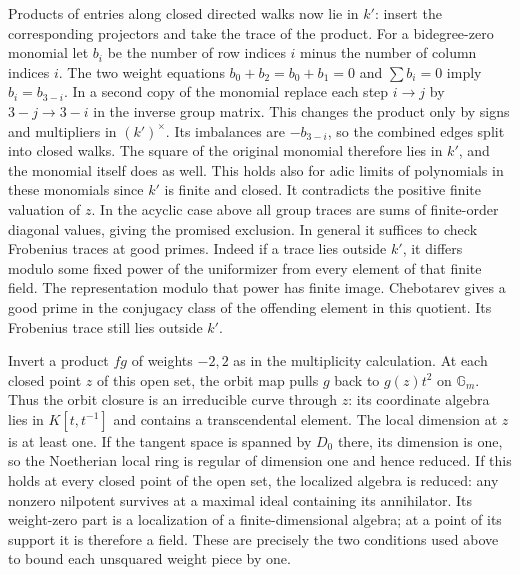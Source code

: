 \documentclass[11pt]{amsart}
\theoremstyle{definition}
\theoremstyle{remark}
\begin{document}
Products of entries along closed directed walks now lie in $k'$:
insert the corresponding projectors and take the trace of the product.
For a bidegree-zero monomial let $b_i$ be the number of row indices
$i$ minus the number of column indices $i$. The two weight equations
$b_0+b_2=b_0+b_1=0$ and $\sum b_i=0$ imply $b_i=b_{3-i}$.
In a second copy of the monomial replace each step $i\to j$ by
$3-j\to3-i$ in the inverse group matrix. This changes the product
only by signs and multipliers in $(k')^\times$. Its imbalances are
$-b_{3-i}$, so the combined edges split into closed walks. The
square of the original monomial therefore lies in $k'$, and the
monomial itself does as well. This holds also for adic limits of
polynomials in these monomials since $k'$ is finite and closed.
It contradicts the positive finite valuation of $z$. In the
acyclic case above all group traces are sums of finite-order
diagonal values, giving the promised exclusion. In general it
suffices to check Frobenius traces at good primes. Indeed if a trace
lies outside $k'$, it differs modulo some fixed power of the uniformizer
from every element of that finite field. The representation modulo
that power has finite image. Chebotarev gives a good prime in the
conjugacy class of the offending element in this quotient. Its
Frobenius trace still lies outside $k'$.

Invert a product $fg$ of weights $-2,2$ as in the multiplicity
calculation. At each closed point $z$ of this open set, the orbit map
pulls $g$ back to $g(z)t^2$ on $\mathbb G_m$. Thus the orbit closure
is an irreducible curve through $z$: its coordinate algebra lies in
$K[t,t^{-1}]$ and contains a transcendental element. The local
dimension at $z$ is at least one. If the tangent space is spanned
by $D_0$ there, its dimension is one, so the Noetherian local ring
is regular of dimension one and hence reduced. If this holds at
every closed point of the open set, the localized algebra is
reduced: any nonzero nilpotent survives at a maximal ideal containing
its annihilator. Its weight-zero part is a localization of a
finite-dimensional algebra; at a point of its support it is
therefore a field. These are precisely the two conditions used above
to bound each unsquared weight piece by one.
\end{document}
